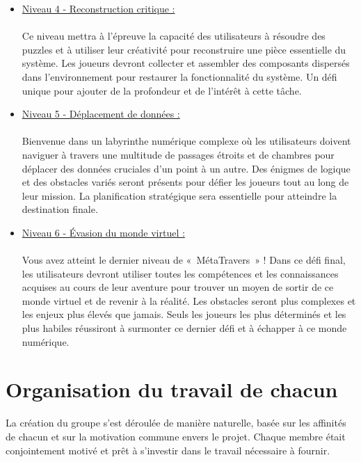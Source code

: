 \documentclass[12pt,a4paper]{article}
\begin{document}
\begin{itemize}
                \item \tabto{1cm} \underline{Niveau 4 - Reconstruction critique :}\\\\
                \tabto{1cm} Ce niveau mettra à l'épreuve la capacité des utilisateurs à résoudre des puzzles et à utiliser leur créativité pour reconstruire une pièce essentielle du système. Les joueurs devront collecter et assembler des composants dispersés dans l'environnement pour restaurer la fonctionnalité du système. Un défi unique pour ajouter de la profondeur et de l'intérêt à cette tâche.\\

                \item \tabto{1cm} \underline{Niveau 5 - Déplacement de données :}\\\\
                \tabto{1cm} Bienvenue dans un labyrinthe numérique complexe où les utilisateurs doivent naviguer à travers une multitude de passages étroits et de chambres pour déplacer des données cruciales d'un point à un autre. Des énigmes de logique et des obstacles variés seront présents pour défier les joueurs tout au long de leur mission. La planification stratégique sera essentielle pour atteindre la destination finale.\\


                \item \tabto{1cm} \underline{Niveau 6 - Évasion du monde virtuel :}\\\\
                \tabto{1cm} Vous avez atteint le dernier niveau de «~MétaTravers~» ! Dans ce défi final, les utilisateurs devront utiliser toutes les compétences et les connaissances acquises au cours de leur aventure pour trouver un moyen de sortir de ce monde virtuel et de revenir à la réalité. Les obstacles seront plus complexes et les enjeux plus élevés que jamais. Seuls les joueurs les plus déterminés et les plus habiles réussiront à surmonter ce dernier défi et à échapper à ce monde numérique.
                
            \end{itemize}

    \section{Organisation du travail de chacun}
        \tabto{1cm} La création du groupe s'est déroulée de manière naturelle, basée sur les affinités de chacun et sur la motivation commune envers le projet. Chaque membre était conjointement motivé et prêt à s'investir dans le travail nécessaire à fournir.
\end{document}
